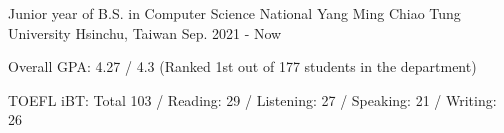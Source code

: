 

\begin{cventries}

  \cventry
    {Junior year of B.S. in Computer Science} %
    {National Yang Ming Chiao Tung University} %
    {Hsinchu, Taiwan} %
    {Sep. 2021 - Now} %
    {
      \begin{cvitems} %
        \item {Overall GPA: 4.27 / 4.3 (Ranked 1st out of 177 students in the department)}
        \item {TOEFL iBT: Total 103 / Reading: 29 / Listening: 27 / Speaking: 21 / Writing: 26}
      \end{cvitems}
    }

\end{cventries}


    
    
    

